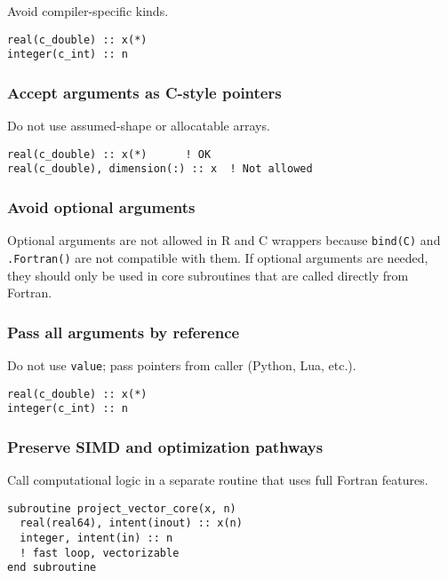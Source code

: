 \documentclass{article}
\begin{document}
Avoid compiler-specific kinds.

\begin{verbatim}
real(c_double) :: x(*)
integer(c_int) :: n
\end{verbatim}

\subsubsection{Accept arguments as C-style pointers}

Do not use assumed-shape or allocatable arrays.

\begin{verbatim}
real(c_double) :: x(*)      ! OK
real(c_double), dimension(:) :: x  ! Not allowed
\end{verbatim}

\subsubsection{Avoid optional arguments}

Optional arguments are not allowed in R and C wrappers because \texttt{bind(C)} and \texttt{.Fortran()} are not compatible with them. If optional arguments are needed, they should only be used in core subroutines that are called directly from Fortran. 

\subsubsection{Pass all arguments by reference}

Do not use \texttt{value}; pass pointers from caller (Python, Lua, etc.).

\begin{verbatim}
real(c_double) :: x(*)
integer(c_int) :: n
\end{verbatim}

\subsubsection{Preserve SIMD and optimization pathways}

Call computational logic in a separate routine that uses full Fortran features.

\begin{verbatim}
subroutine project_vector_core(x, n)
  real(real64), intent(inout) :: x(n)
  integer, intent(in) :: n
  ! fast loop, vectorizable
end subroutine
\end{verbatim}
\end{document}
